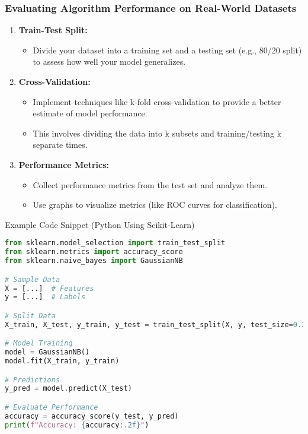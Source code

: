 \documentclass{beamer}
\begin{document}
\begin{frame}[fragile]
    \frametitle{Evaluating Algorithm Performance on Real-World Datasets}
    \begin{enumerate}
        \item \textbf{Train-Test Split:}
        \begin{itemize}
            \item Divide your dataset into a training set and a testing set (e.g., 80/20 split) to assess how well your model generalizes.
        \end{itemize}
        
        \item \textbf{Cross-Validation:}
        \begin{itemize}
            \item Implement techniques like k-fold cross-validation to provide a better estimate of model performance.
            \item This involves dividing the data into k subsets and training/testing k separate times.
        \end{itemize}
        
        \item \textbf{Performance Metrics:}
        \begin{itemize}
            \item Collect performance metrics from the test set and analyze them.
            \item Use graphs to visualize metrics (like ROC curves for classification).
        \end{itemize}
    \end{enumerate}

    \begin{block}{Example Code Snippet (Python Using Scikit-Learn)}
    \begin{lstlisting}[language=Python]
from sklearn.model_selection import train_test_split
from sklearn.metrics import accuracy_score
from sklearn.naive_bayes import GaussianNB

# Sample Data
X = [...]  # Features
y = [...]  # Labels

# Split Data
X_train, X_test, y_train, y_test = train_test_split(X, y, test_size=0.2, random_state=42)

# Model Training
model = GaussianNB()
model.fit(X_train, y_train)

# Predictions
y_pred = model.predict(X_test)

# Evaluate Performance
accuracy = accuracy_score(y_test, y_pred)
print(f"Accuracy: {accuracy:.2f}")
    \end{lstlisting}
    \end{block}
\end{frame}
\end{document}
